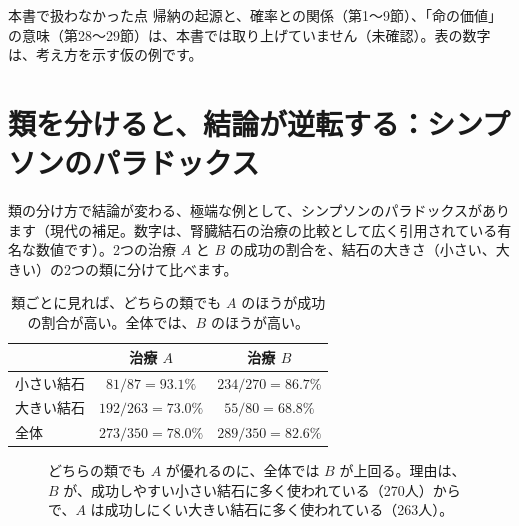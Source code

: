 \documentclass[a4paper,11pt,openany]{ltjsbook}
\begin{document}
\begin{notebox}{本書で扱わなかった点}
帰納の起源と、確率との関係（第1〜9節）、「命の価値」の意味（第28〜29節）は、本書では取り上げていません（未確認）。表の数字は、考え方を示す仮の例です。
\end{notebox}

\section{類を分けると、結論が逆転する：シンプソンのパラドックス}

類の分け方で結論が変わる、極端な例として、シンプソンのパラドックスがあります（現代の補足。数字は、腎臓結石の治療の比較として広く引用されている有名な数値です）。2つの治療 $A$ と $B$ の成功の割合を、結石の大きさ（小さい、大きい）の2つの類に分けて比べます。

\begin{table}[htbp]
\centering
\begin{tabular}{lcc}
\toprule
 & 治療 $A$ & 治療 $B$\\
\midrule
小さい結石 & $81/87=93.1\%$ & $234/270=86.7\%$\\
大きい結石 & $192/263=73.0\%$ & $55/80=68.8\%$\\
\midrule
全体 & $273/350=78.0\%$ & $289/350=82.6\%$\\
\bottomrule
\end{tabular}
\caption{類ごとに見れば、どちらの類でも $A$ のほうが成功の割合が高い。全体では、$B$ のほうが高い。}
\end{table}

\begin{figure}[htbp]
\centering
{}
\caption{どちらの類でも $A$ が優れるのに、全体では $B$ が上回る。理由は、$B$ が、成功しやすい小さい結石に多く使われている（270人）からで、$A$ は成功しにくい大きい結石に多く使われている（263人）。}
\end{figure}
\end{document}
